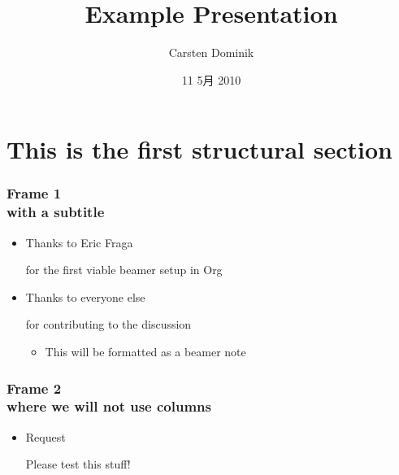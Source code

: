 \documentclass[11pt]{beamer}
\title{Example Presentation}
\author{Carsten Dominik}
\date{11 5月 2010}
\begin{document}
\maketitle

\setcounter{tocdepth}{3}
\tableofcontents
\vspace*{1cm}

\section{This is the first structural section}
\label{sec-1}


\begin{frame}\frametitle{Frame 1 \\ with a subtitle}
\label{sec-1.1}


\begin{itemize}

\item Thanks to Eric Fraga\\
\label{sec-1.1.1}

    for the first viable beamer setup in Org


\item Thanks to everyone else\\
\label{sec-1.1.2}

    for contributing to the discussion
    
\begin{itemize}

\item This will be formatted as a beamer note\\
\label{sec-1.1.2.1}


\end{itemize} %
\end{itemize} %
\end{frame}
\begin{frame}\frametitle{Frame 2 \\ where we will not use columns}
\label{sec-1.2}


\begin{itemize}

\item Request\\
\label{sec-1.2.1}

    Please test this stuff!
    
\end{itemize} %
\end{frame}
\end{document}
